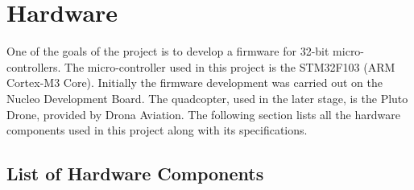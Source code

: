 \documentclass[a4paper,12pt,oneside]{book}
\begin{document}

\chapter[Hardware]{Hardware}
One of the goals of the project is to develop a firmware for 32-bit micro-controllers. The micro-controller used in this project is the STM32F103 (ARM Cortex-M3 Core). Initially the firmware development was carried out on the Nucleo Development Board. The quadcopter, used in the later stage, is the Pluto Drone, provided by Drona Aviation. The following section lists all the hardware components used in this project along with its specifications.

\section{List of Hardware Components}
\end{document}
